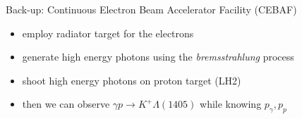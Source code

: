 \documentclass[11pt,aspectratio=1610,dvipsnames]{beamer}
\begin{document}
\begin{frame}{Back-up: Continuous Electron Beam Accelerator Facility (CEBAF)}
	\begin{tcolorbox}[colback=black!10,colframe=gray!20!black,title=How can we access $\Lambda(1405)$ with this setup?]
		\begin{itemize}
			\item employ radiator target for the electrons
			\item generate high energy photons using the \emph{bremsstrahlung} process
			\item shoot high energy photons on proton target (LH2)
			\item then we can observe $\gamma p \to K^+\Lambda(1405)$ while knowing $p_\gamma,p_p$
		\end{itemize} 
		
	\end{tcolorbox}
\end{frame}
\end{document}
